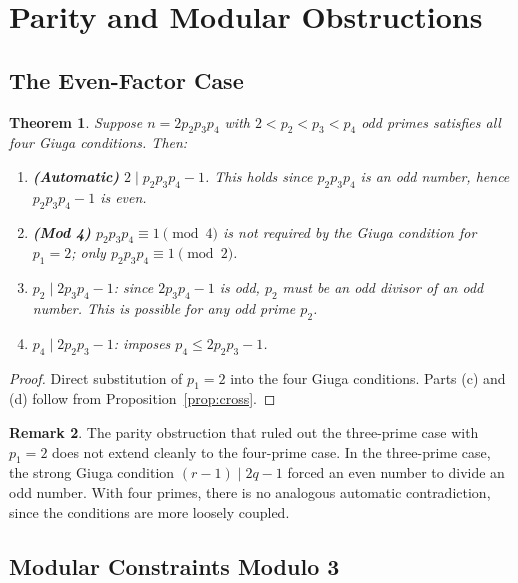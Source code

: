\documentclass[12pt,a4paper]{amsart}
\newtheorem{theorem}{Theorem}[section]
\theoremstyle{definition}
\newtheorem{remark}[theorem]{Remark}
\begin{document}
\section{Parity and Modular Obstructions}
\label{sec:parity}

\subsection{The Even-Factor Case}

\begin{theorem}
\label{thm:parity-constraints}
Suppose $n = 2 p_2 p_3 p_4$ with $2 < p_2 < p_3 < p_4$ odd primes satisfies
all four Giuga conditions.  Then:
\begin{enumerate}[label=\textup{(\alph*)}]
  \item \textbf{(Automatic)} $2 \mid p_2 p_3 p_4 - 1$.  This holds since
        $p_2 p_3 p_4$ is an odd number, hence $p_2 p_3 p_4 - 1$ is even.
  \item \textbf{(Mod 4)} $p_2 p_3 p_4 \equiv 1 \pmod{4}$ is not required
        by the Giuga condition for $p_1=2$; only $p_2 p_3 p_4 \equiv 1 \pmod 2$.
  \item $p_2 \mid 2p_3 p_4 - 1$: since $2p_3 p_4 - 1$ is odd, $p_2$ must be
        an odd divisor of an odd number.  This is possible for any odd prime $p_2$.
  \item $p_4 \mid 2 p_2 p_3 - 1$: imposes $p_4 \le 2 p_2 p_3 - 1$.
\end{enumerate}
\end{theorem}

\begin{proof}
Direct substitution of $p_1 = 2$ into the four Giuga conditions.  Parts
(c) and (d) follow from Proposition~\ref{prop:cross}.
\end{proof}

\begin{remark}
The parity obstruction that ruled out the three-prime case with $p_1 = 2$
does not extend cleanly to the four-prime case.  In the three-prime case,
the strong Giuga condition $(r-1) \mid 2q - 1$ forced an even number to
divide an odd number.  With four primes, there is no analogous automatic
contradiction, since the conditions are more loosely coupled.
\end{remark}

\subsection{Modular Constraints Modulo 3}
\end{document}
